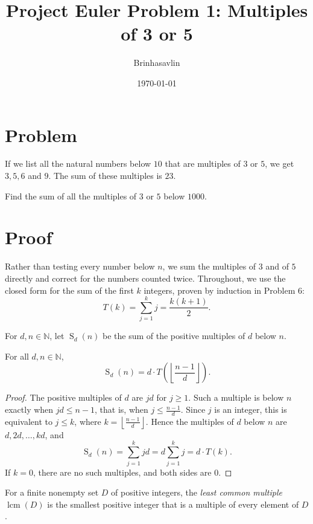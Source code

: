 \documentclass{article}
\title{Project Euler Problem 1: Multiples of 3 or 5}
\author{Brinhasavlin}
\date{\today}
\begin{document}
\maketitle

\section*{Problem}

If we list all the natural numbers below $10$ that are multiples of $3$ or $5$, we get $3, 5, 6$ and $9$. The sum of these multiples is $23$.

Find the sum of all the multiples of $3$ or $5$ below $1000$.

\section*{Proof}
Rather than testing every number below $n$, we sum the multiples of $3$ and of $5$ directly and correct for the numbers
counted twice. Throughout, we use the closed form for the sum of the first $k$ integers, proven by induction in
Problem 6:
\[
  T(k) = \sum_{j=1}^{k} j = \frac{k(k+1)}{2}.
\]

\begin{definition}\label{def:multsum}
  For $d, n \in \mathbb{N}$, let $\operatorname{S}_d(n)$ be the sum of the positive multiples of $d$ below $n$.
\end{definition}

\begin{lemma}\label{lem:multsum}
  For all $d, n \in \mathbb{N}$,
  \[
    \operatorname{S}_d(n) = d \cdot T\!\left(\left\lfloor \frac{n-1}{d} \right\rfloor\right).
  \]
\end{lemma}
\begin{proof}
  The positive multiples of $d$ are $jd$ for $j \ge 1$. Such a multiple is below $n$ exactly when $jd \le n - 1$, that
  is, when $j \le \frac{n-1}{d}$. Since $j$ is an integer, this is equivalent to $j \le k$, where
  $k = \left\lfloor \frac{n-1}{d} \right\rfloor$. Hence the multiples of $d$ below $n$ are $d, 2d, \dots, kd$, and
  \[
    \operatorname{S}_d(n) = \sum_{j=1}^{k} jd = d \sum_{j=1}^{k} j = d \cdot T(k).
  \]
  If $k = 0$, there are no such multiples, and both sides are $0$.
\end{proof}

\begin{definition}\label{def:lcm}
  For a finite nonempty set $D$ of positive integers, the \emph{least common multiple} $\operatorname{lcm}(D)$ is the
  smallest positive integer that is a multiple of every element of $D$.
\end{definition}
\end{document}
